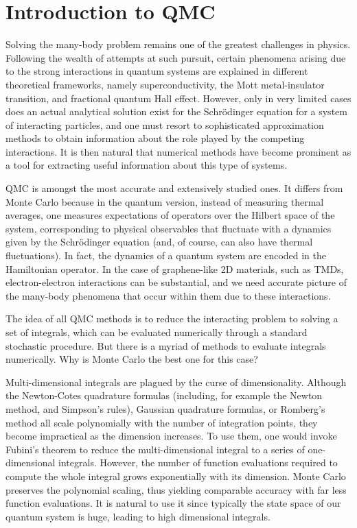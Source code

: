 \section{Introduction to \acl{QMC}}
\label{sec:introQMC}

Solving the many-body problem remains one of the greatest challenges in physics.
Following the wealth of attempts at such pursuit, certain phenomena arising due to the strong interactions in quantum systems are explained in different theoretical frameworks, namely superconductivity, the Mott metal-insulator transition, and fractional quantum Hall effect.
However, only in very limited cases does an actual analytical solution exist for the  Schr\"odinger equation for a system of interacting particles, and one must resort to sophisticated approximation methods to obtain information about the role played by the competing interactions.
It is then natural that numerical methods have become prominent as a tool for extracting useful information about this type of systems.

\ac{QMC} is amongst the most accurate and extensively studied ones.
It differs from  Monte Carlo because in the quantum version, instead of measuring thermal averages, one measures expectations of operators over the Hilbert space of the system, corresponding to physical observables that fluctuate with a dynamics given by the Schr\"odinger equation (and, of course, can also have thermal fluctuations).
In fact, the dynamics of a quantum system are encoded in the Hamiltonian operator.
In the case of graphene-like \ac{2D} materials, such as \acp{TMD}, electron-electron interactions can be substantial, and we need accurate picture of the many-body phenomena that occur within them due to these interactions.

The idea of all \ac{QMC} methods is to reduce the interacting problem to solving a set of integrals, which can be evaluated numerically through a standard stochastic procedure.
But there is a myriad of methods to evaluate integrals numerically.
Why is Monte Carlo the best one for this case?

Multi-dimensional integrals are plagued by the curse of dimensionality.
Although the Newton-Cotes quadrature formulas (including, for example the Newton method, and Simpson's rules), Gaussian quadrature formulas, or Romberg's method all scale polynomially with the number of integration points, they become impractical as the dimension increases.
To use them, one would invoke Fubini's theorem to reduce the multi-dimensional integral to a series of one-dimensional integrals.
However, the number of function evaluations required to compute the whole integral grows exponentially with its dimension.
Monte Carlo preserves the polynomial scaling, thus yielding comparable accuracy with far less function evaluations.
It is natural to use it since typically the state space of our quantum system is huge, leading to high dimensional integrals.

